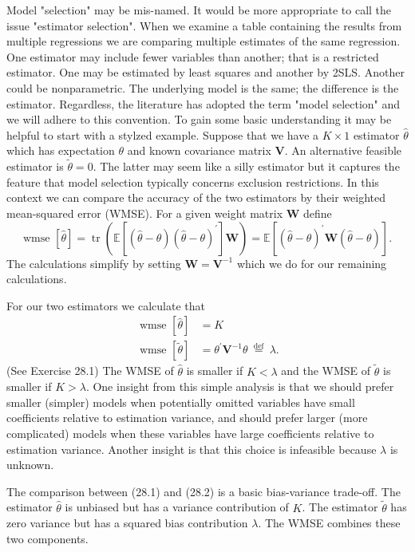 \documentclass[10pt]{article}
\begin{document}
Model "selection" may be mis-named. It would be more appropriate to call the issue "estimator selection". When we examine a table containing the results from multiple regressions we are comparing multiple estimates of the same regression. One estimator may include fewer variables than another; that is a restricted estimator. One may be estimated by least squares and another by 2SLS. Another could be nonparametric. The underlying model is the same; the difference is the estimator. Regardless, the literature has adopted the term "model selection" and we will adhere to this convention. To gain some basic understanding it may be helpful to start with a stylzed example. Suppose that we have a $K \times 1$ estimator $\widehat{\theta}$ which has expectation $\theta$ and known covariance matrix $\boldsymbol{V}$. An alternative feasible estimator is $\widetilde{\theta}=0$. The latter may seem like a silly estimator but it captures the feature that model selection typically concerns exclusion restrictions. In this context we can compare the accuracy of the two estimators by their weighted mean-squared error (WMSE). For a given weight matrix $\boldsymbol{W}$ define
$$
\text { wmse }[\widehat{\theta}]=\operatorname{tr}\left(\mathbb{E}\left[(\widehat{\theta}-\theta)(\widehat{\theta}-\theta)^{\prime}\right] \boldsymbol{W}\right)=\mathbb{E}\left[(\widehat{\theta}-\theta)^{\prime} \boldsymbol{W}(\widehat{\theta}-\theta)\right] \text {. }
$$
The calculations simplify by setting $\boldsymbol{W}=\boldsymbol{V}^{-1}$ which we do for our remaining calculations.

For our two estimators we calculate that
$$
\begin{aligned}
\text { wmse }[\hat{\theta}] &=K \\
\text { wmse }[\widetilde{\theta}] &=\theta^{\prime} \boldsymbol{V}^{-1} \theta \stackrel{\text { def }}{=} \lambda .
\end{aligned}
$$
(See Exercise 28.1) The WMSE of $\widehat{\theta}$ is smaller if $K<\lambda$ and the WMSE of $\widetilde{\theta}$ is smaller if $K>\lambda$. One insight from this simple analysis is that we should prefer smaller (simpler) models when potentially omitted variables have small coefficients relative to estimation variance, and should prefer larger (more complicated) models when these variables have large coefficients relative to estimation variance. Another insight is that this choice is infeasible because $\lambda$ is unknown.

The comparison between (28.1) and (28.2) is a basic bias-variance trade-off. The estimator $\widehat{\theta}$ is unbiased but has a variance contribution of $K$. The estimator $\widetilde{\theta}$ has zero variance but has a squared bias contribution $\lambda$. The WMSE combines these two components.
\end{document}
